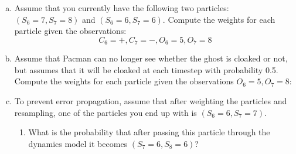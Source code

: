 \documentclass[a4paper]{article}
\newif\ifsol
\begin{document}
    \begin{enumerate}[a)]
        \item Assume that you currently have the following two particles: $(S_6 = 7, S_7 = 8)$ and $(S_6 = 6, S_7 = 6)$. Compute the weights for each particle given the observations: $$C_6 = +, C_7 = −, O_6 = 5, O_7 = 8$$
        \ifsol {\color{blue} 
        $(S_6 = 7, S_7 = 8)$: $P(O_6 = 5|C_6 = +, S_6 = 7) ∗ P(O_7 = 8|C_7 = −, S_7 = 8) = 0.1 ∗ 0.6 = 0.06$.\\
        $(S_6 = 6, S_7 = 6)$: $P(O_6 = 5|C_6 = +, S_6 = 6) ∗ P(O_7 = 8|C_7 = −, S_7 = 6) = 0.2 ∗ 0 = 0$}\\
        \else \bigskip \bigskip \bigskip
        \fi
        
        \item Assume that Pacman can no longer see whether the ghost is cloaked or not, but assumes that it will be cloaked at each timestep with probability 0.5. Compute the weights for each particle given the observations $O_6 = 5, O_7 = 8$:\\
        \ifsol {\color{blue} 
        For each of the particle’s states: we want to find $P(o_t|s_t)$, as this is the contribution to the weight of the sample. However, we have C unobserved, so: $P(o_t|s_t) = \sum_{c_t} P(o_t, c_t|s_t) = \sum_{c_t}P(c_t|s_t)P(o_t|s_t, c_t) = \sum_{c_t}P(c_t)P(o_t|s_t, c_t).$ The last equality is due to independence between Ct and St. Therefore:
        \begin{equation*}
            \begin{split}
            (S_6 = 7, S_7 = 8): \sum_{c_6}& P(c_6)P(O_6 = 5|S_6 = 7, c_6) ∗ \sum_{c_7}P(c_7)P(O_7 = 8|S_7 = 8, c_7) = \\ &(0.5 ∗ 0.1 + 0.5 ∗ 0) ∗ (0.5 ∗ 0.4 + 0.5 ∗ 0.6) = 0.05 ∗ 0.5 = 0.025\\ 
            (S_6 = 6, S_7 = 6): \sum_{c_6}& P(c_6)P(O_6 = 5|S_6 = 6, c_6) ∗ \sum_{c_7}P(c_7)P(O_7 = 8|S_7 = 6, c_7) = \\ &(0.5 ∗ 0.4 + 0.5 ∗ 0.6) ∗ (0.5 ∗ 0.1 + 0.5 ∗ 0) = 0.5 ∗ 0.05 = 0.025
            \end{split}
        \end{equation*}} \\
        \else \bigskip \bigskip \bigskip
        \fi
        
        \item To prevent error propagation, assume that after weighting the particles and resampling, one of the particles you end up with is $(S_6 = 6, S_7 = 7)$.
        \begin{enumerate}
            \item What is the probability that after passing this particle through the dynamics model it becomes $(S_7 = 6, S_8 = 6)$?\\
            \ifsol {\color{blue} 0. It’s invalid for a particle to start at $S_7 = 7$ and after one transition, become $S_7 = 6$.} \\
            \else \bigskip \bigskip
            \fi
            

\end{enumerate}
\end{enumerate}
\end{document}
